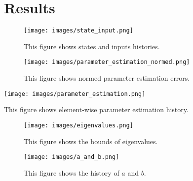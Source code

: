 \documentclass[nobib]{my-handout}
\theoremstyle{definition}
\theoremstyle{remark}
\begin{document}


\section{Results}

\begin{figure*}[h]
	\texttt{[image: images/state\_input.png]}
	\caption{This figure shows states and inputs histories.}
\end{figure*}


\begin{figure}[h]
	\texttt{[image: images/parameter\_estimation\_normed.png]}
	\caption{This figure shows normed parameter estimation errors.}
\end{figure}

\begin{marginfigure}[1cm]
	\texttt{[image: images/parameter\_estimation.png]}
	\caption{This figure shows element-wise parameter estimation history.}
\end{marginfigure}

\begin{figure}[h]
	\texttt{[image: images/eigenvalues.png]}
	\caption{This figure shows the bounds of eigenvalues.}
\end{figure}

\begin{figure*}[h]
	\texttt{[image: images/a\_and\_b.png]}
	\caption{This figure shows the history of $a$ and $b$.}
\end{figure*}



\end{document}
